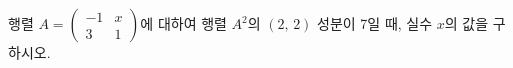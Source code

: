행렬 $A=\begin{pmatrix} -1 & x \\ 3 & 1 \end{pmatrix}$에 대하여 행렬 $A^2$의 $(2,\,2)$ 성분이 7일 때, 실수 $x$의 값을 구하시오.
